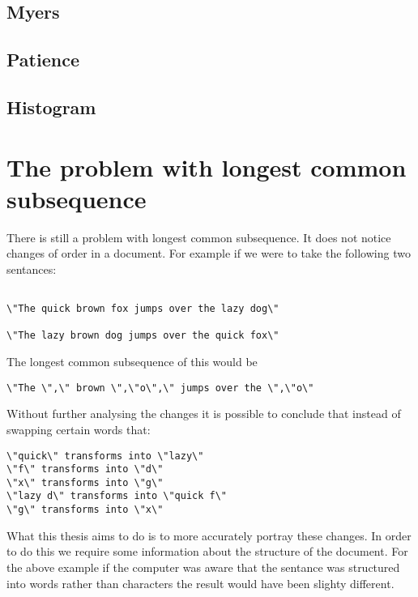 \subsection{Myers}


\subsection{Patience}


\subsection{Histogram}

\section{The problem with longest common subsequence}
There is still a problem with longest common subsequence. It does not notice changes of order in a document.  For example if we were to take the following two sentances:

\begin{verbatim}

\"The quick brown fox jumps over the lazy dog\"

\"The lazy brown dog jumps over the quick fox\"

\end{verbatim}

The longest common subsequence of this would be

\begin{verbatim}
\"The \",\" brown \",\"o\",\" jumps over the \",\"o\"
\end{verbatim}

Without further analysing the changes it is possible to conclude that instead of swapping certain words that:

\begin{verbatim}
\"quick\" transforms into \"lazy\"
\"f\" transforms into \"d\"
\"x\" transforms into \"g\"
\"lazy d\" transforms into \"quick f\"
\"g\" transforms into \"x\"
\end{verbatim}

What this thesis aims to do is to more accurately portray these changes.
In order to do this we require some information about the structure of the document.
For the above example if the computer was aware that the sentance was structured into words rather than characters the result would have been slighty different.

